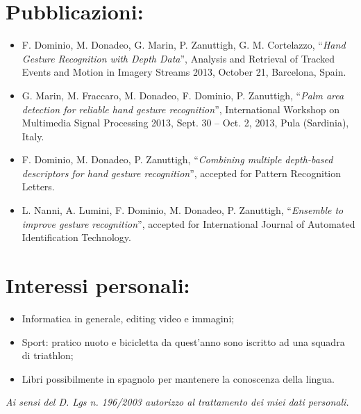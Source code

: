 \documentclass[pdftex,a4paper,10pt,twoside,titlepage,italian]{article}
\begin{document}
\section*{Pubblicazioni:}
\begin{itemize}
\item F. Dominio, M. Donadeo, G. Marin, P. Zanuttigh, G. M. Cortelazzo, ``\textit{Hand Gesture Recognition with Depth Data}'', Analysis and Retrieval of Tracked Events and Motion in Imagery Streams 2013, October 21, Barcelona, Spain.
\item G. Marin, M. Fraccaro, M. Donadeo, F. Dominio, P. Zanuttigh, ``\textit{Palm area detection for reliable hand gesture recognition}'', International Workshop on Multimedia Signal Processing 2013, Sept. 30 – Oct. 2, 2013, Pula (Sardinia), Italy.
\item F. Dominio, M. Donadeo, P. Zanuttigh, ``\textit{Combining multiple depth-based descriptors for hand gesture recognition}'',
accepted for Pattern Recognition Letters.
\item L. Nanni, A. Lumini, F. Dominio, M. Donadeo, P. Zanuttigh, ``\textit{Ensemble to improve gesture recognition}'',
accepted for International Journal of Automated Identification Technology.
\end{itemize}
\section*{Interessi personali: }
\begin{itemize}
	\item Informatica in generale, editing video e immagini;
	\item Sport: pratico nuoto e bicicletta da quest'anno sono iscritto ad una squadra di triathlon;
	\item Libri possibilmente in spagnolo per mantenere la conoscenza della lingua.
\end{itemize}
\vfill

\textit{Ai sensi del D. Lgs n. 196/2003 autorizzo al trattamento dei miei dati personali.}
\end{document}
